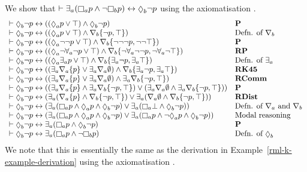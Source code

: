 \begin{example}\label{rml-k45-example-derivation}
We show that $\proves \somerefsA (\necessaryA \atomP \land \lnot \necessaryB \atomP) \iff \possibleB \lnot \atomP$ using the axiomatisation \axiomRmlKFF{}.
$$
\begin{array}{ll}
    \proves \possibleB \lnot \atomP \iff ((\possibleA \atomP \lor \top) \land \possibleB \lnot \atomP) & {\bf P}\\
    \proves \possibleB \lnot \atomP \iff ((\possibleA \atomP \lor \top) \land \coversB \{\lnot \atomP, \top\}) & \text{Defn. of $\coversB$}\\
    \proves \possibleB \lnot \atomP \iff ((\possibleA \lnot \lnot \atomP \lor \top) \land \coversB \{\lnot \lnot \lnot \atomP, \lnot \lnot \top\}) & {\bf P}\\
    \proves \possibleB \lnot \atomP \iff ((\possibleA \lnot \allrefsA \lnot \atomP \lor \top) \land \coversB \{\lnot \allrefsA \lnot \lnot \atomP, \lnot \allrefsA \lnot \top\}) & {\bf RP}\\
    \proves \possibleB \lnot \atomP \iff ((\possibleA \somerefsA \atomP \lor \top) \land \coversB \{\somerefsA \lnot \atomP, \somerefsA \top\}) & \text{Defn. of $\somerefsA$}\\
    \proves \possibleB \lnot \atomP \iff ((\somerefsA \coversA \{\atomP\} \lor \somerefsA \coversA \emptyset) \land \coversB \{\somerefsA \lnot \atomP, \somerefsA \top\}) & {\bf RK45}\\
    \proves \possibleB \lnot \atomP \iff ((\somerefsA \coversA \{\atomP\} \lor \somerefsA \coversA \emptyset) \land \somerefsA \coversB \{\lnot \atomP, \top\}) & {\bf RComm}\\
    \proves \possibleB \lnot \atomP \iff ((\somerefsA \coversA \{\atomP\} \land \somerefsA \coversB \{\lnot \atomP, \top\}) \lor (\somerefsA \coversA \emptyset \land \somerefsA \coversB \{\lnot \atomP, \top\})) & {\bf P}\\
    \proves \possibleB \lnot \atomP \iff (\somerefsA (\coversA \{\atomP\} \land \coversB \{\lnot \atomP, \top\}) \lor \somerefsA (\coversA \emptyset \land \coversB \{\lnot \atomP, \top\})) & {\bf RDist}\\
    \proves \possibleB \lnot \atomP \iff (\somerefsA (\necessaryA \atomP \land \possibleA \atomP \land \possibleB \lnot \atomP) \lor \somerefsA (\necessaryA \bot \land \possibleB \lnot \atomP)) & \text{Defn. of $\coversA$ and $\coversB$}\\
    \proves \possibleB \lnot \atomP \iff (\somerefsA (\necessaryA \atomP \land \possibleA \atomP \land \possibleB \lnot \atomP) \lor \somerefsA (\necessaryA \atomP \land \lnot \possibleA \atomP \land \possibleB \lnot \atomP)) & \text{Modal reasoning}\\
    \proves \possibleB \lnot \atomP \iff \somerefsA (\necessaryA \atomP \land \possibleB \lnot \atomP) & {\bf P}\\
    \proves \possibleB \lnot \atomP \iff \somerefsA (\necessaryA \atomP \land \lnot \necessaryB \atomP) & \text{Defn. of $\possibleB$}
\end{array}
$$
We note that this is essentially the same as the derivation in Example~\ref{rml-k-example-derivation} using the axiomatisation \axiomRmlK{}.
\end{example}

